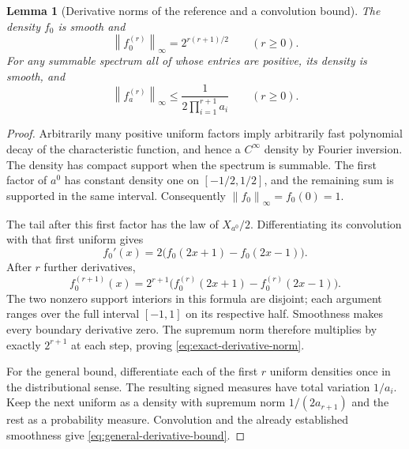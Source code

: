 \documentclass[11pt,a4paper]{article}
\numberwithin{equation}{section}
\newtheorem{lemma}[theorem]{Lemma}
\theoremstyle{definition}
\theoremstyle{remark}
\newcommand{\norm}[1]{\left\lVert #1\right\rVert}
\begin{document}
\begin{lemma}[Derivative norms of the reference and a convolution bound]
\label{lem:derivatives}
The density $f_0$ is smooth and
\begin{equation}
 \norm{f_0^{(r)}}_\infty=2^{r(r+1)/2}\qquad(r\ge0).
 \label{eq:exact-derivative-norm}
\end{equation}
For any summable spectrum all of whose entries are positive, its density is
smooth, and
\begin{equation}
 \norm{f_a^{(r)}}_\infty
 \le\frac1{2\prod_{i=1}^{r+1}a_i}\qquad(r\ge0).
 \label{eq:general-derivative-bound}
\end{equation}
\end{lemma}
\begin{proof}
Arbitrarily many positive uniform factors imply arbitrarily fast polynomial
decay of the characteristic function, and hence a $C^\infty$ density by
Fourier inversion. The density has compact support when the spectrum is
summable. The first factor of $a^0$ has constant density one on
$[-1/2,1/2]$, and the remaining sum is supported in the same interval.
Consequently $\norm{f_0}_\infty=f_0(0)=1$.

The tail after this first factor has the law of $X_{a^0}/2$.
Differentiating its convolution with that first uniform gives
\[
 f_0'(x)=2\bigl(f_0(2x+1)-f_0(2x-1)\bigr).
\]
After $r$ further derivatives,
\[
 f_0^{(r+1)}(x)=2^{r+1}
       \bigl(f_0^{(r)}(2x+1)-f_0^{(r)}(2x-1)\bigr).
\]
The two nonzero support interiors in this formula are disjoint; each argument
ranges over the full interval $[-1,1]$ on its respective half. Smoothness
makes every boundary derivative zero. The supremum norm therefore multiplies
by exactly $2^{r+1}$ at each step, proving
\eqref{eq:exact-derivative-norm}.

For the general bound, differentiate each of the first $r$ uniform densities
once in the distributional sense. The resulting signed measures have total
variation $1/a_i$. Keep the next uniform as a density with supremum norm
$1/(2a_{r+1})$ and the rest as a probability measure. Convolution and the
already established smoothness give \eqref{eq:general-derivative-bound}.
\end{proof}
\end{document}
